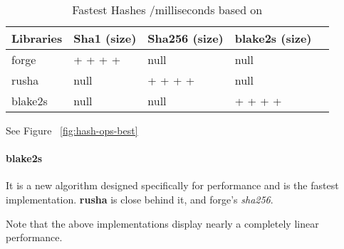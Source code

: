 \begin{table}[!h]
\centering
\caption{Fastest Hashes /milliseconds based on \cite {Tarr2014PerformanceLibraries.}}
\label{hashing-small-files}
\begin{adjustbox}{center, width=\columnwidth-20pt}
\begin{tabular}{|l|l|l|l|l|}
\hline
Libraries & Sha1 (size) & Sha256 (size) & blake2s (size) \\ \hline
forge	& + + + +	& null		& null		\\ \hline
rusha	& null		& + + + +	& null		\\ \hline
blake2s	& null		& null		& + + + +	\\ \hline
\end{tabular}
\end{adjustbox}
See Figure ~\ref{fig:hash-ops-best}
\end{table}

\paragraph{blake2s} It is a new algorithm designed specifically for performance and is the fastest implementation. \textbf{rusha} is close behind it, and forge's \textit{sha256}.

Note that the above implementations display nearly a completely linear performance.

